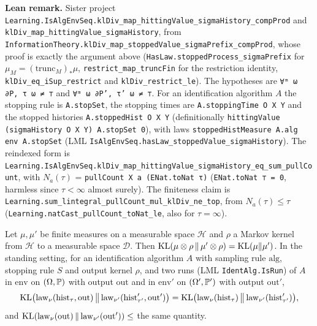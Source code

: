 \textbf{Lean remark.} Sister project
\texttt{Learning.IsAlgEnvSeq.klDiv\_map\_hittingValue\_sigmaHistory\_compProd} and
\texttt{klDiv\_map\_hittingValue\_sigmaHistory}, from
\texttt{InformationTheory.klDiv\_map\_stoppedValue\_sigmaPrefix\_compProd}, whose proof is
exactly the argument above (\texttt{HasLaw.stoppedProcess\_sigmaPrefix} for
$\mu_M = (\mathrm{trunc}_M)_*\mu$, \texttt{restrict\_map\_truncFin} for the restriction
identity, \texttt{klDiv\_eq\_iSup\_restrict} and \texttt{klDiv\_restrict\_le}). The hypotheses
are \texttt{∀ᵐ ω ∂P, τ ω ≠ ⊤} and \texttt{∀ᵐ ω ∂P', τ' ω ≠ ⊤}. For an identification algorithm
$A$ the stopping rule is \texttt{A.stopSet}, the stopping times are \texttt{A.stoppingTime O X Y}
and the stopped histories \texttt{A.stoppedHist O X Y} (definitionally
\texttt{hittingValue (sigmaHistory O X Y) A.stopSet 0}), with laws
\texttt{stoppedHistMeasure A.alg env A.stopSet} (LML
\texttt{IsAlgEnvSeq.hasLaw\_stoppedValue\_sigmaHistory}). The reindexed form is
\texttt{Learning.IsAlgEnvSeq.klDiv\_map\_hittingValue\_sigmaHistory\_eq\_sum\_pullCount}, with
$N_a(\tau)$ = \texttt{pullCount X a (ENat.toNat τ)} (\texttt{ENat.toNat ⊤ = 0}, harmless since
$\tau < \infty$ almost surely). The finiteness claim is
\texttt{Learning.sum\_lintegral\_pullCount\_mul\_klDiv\_ne\_top}, from
$N_a(\tau) \le \tau$ (\texttt{Learning.natCast\_pullCount\_toNat\_le}, also for $\tau = \infty$).

\begin{lemma}\label{lem:kl_output_pair}
\leanok
Let $\mu, \mu'$ be finite measures on a measurable space $\mathcal H$ and $\rho$ a Markov kernel
from $\mathcal H$ to a measurable space $\mathcal D$. Then
$\mathrm{KL}(\mu\otimes\rho\,\|\,\mu'\otimes\rho) = \mathrm{KL}(\mu\|\mu')$. In the standing setting, for an
identification algorithm $A$ with sampling rule $\mathrm{alg}$, stopping rule $S$ and output
kernel $\rho$, and two runs (LML \texttt{IdentAlg.IsRun}) of $A$ in $\mathrm{env}$ on
$(\Omega, \mathbb{P})$ with output $\mathrm{out}$ and in $\mathrm{env}'$ on $(\Omega', \mathbb{P}')$ with
output $\mathrm{out}'$,
\[
  \mathrm{KL}\big(\mathrm{law}_\nu(\mathrm{hist}_\tau, \mathrm{out})\,\big\|\,\mathrm{law}_{\nu'}(\mathrm{hist}'_{\tau'}, \mathrm{out}')\big)
  = \mathrm{KL}\big(\mathrm{law}_\nu(\mathrm{hist}_\tau)\,\big\|\,\mathrm{law}_{\nu'}(\mathrm{hist}'_{\tau'})\big),
\]
and $\mathrm{KL}(\mathrm{law}_\nu(\mathrm{out})\,\|\,\mathrm{law}_{\nu'}(\mathrm{out}')) \le$ the same
quantity.
\end{lemma}

